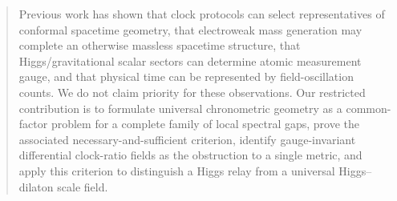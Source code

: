 \documentclass[11pt,a4paper]{article}
\begin{document}
\begin{quote}
Previous work has shown that clock protocols can select representatives of conformal spacetime geometry, that electroweak mass generation may complete an otherwise massless spacetime structure, that Higgs/gravitational scalar sectors can determine atomic measurement gauge, and that physical time can be represented by field-oscillation counts. We do not claim priority for these observations. Our restricted contribution is to formulate universal chronometric geometry as a common-factor problem for a complete family of local spectral gaps, prove the associated necessary-and-sufficient criterion, identify gauge-invariant differential clock-ratio fields as the obstruction to a single metric, and apply this criterion to distinguish a Higgs relay from a universal Higgs--dilaton scale field.
\end{quote}
\end{document}
